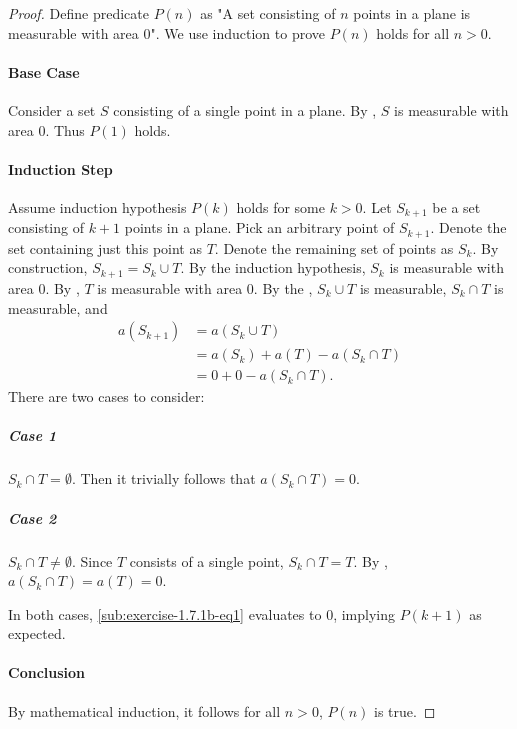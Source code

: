\documentclass{report}
\begin{document}
\begin{proof}

  Define predicate $P(n)$ as "A set consisting of $n$ points in a plane is
    measurable with area $0$".
  We use induction to prove $P(n)$ holds for all $n > 0$.

  \paragraph{Base Case}%

    Consider a set $S$ consisting of a single point in a plane.
    By , $S$ is measurable with area $0$.
    Thus $P(1)$ holds.

  \paragraph{Induction Step}%

    Assume induction hypothesis $P(k)$ holds for some $k > 0$.
    Let $S_{k+1}$ be a set consisting of $k + 1$ points in a plane.
    Pick an arbitrary point of $S_{k+1}$.
    Denote the set containing just this point as $T$.
    Denote the remaining set of points as $S_k$.
    By construction, $S_{k+1} = S_k \cup T$.
    By the induction hypothesis, $S_k$ is measurable with area $0$.
    By , $T$ is measurable with area $0$.
    By the , $S_k \cup T$ is
      measurable, $S_k \cap T$ is measurable, and
      \begin{align}
        a(S_{k+1})
          & = a(S_k \cup T) \nonumber \\
          & = a(S_k) + a(T) - a(S_k \cap T) \nonumber \\
          & = 0 + 0 - a(S_k \cap T). \label{sub:exercise-1.7.1b-eq1}
      \end{align}
    There are two cases to consider:

    \subparagraph{Case 1}%

      $S_k \cap T = \emptyset$.
      Then it trivially follows that $a(S_k \cap T) = 0$.

    \subparagraph{Case 2}%

      $S_k \cap T \neq \emptyset$.
      Since $T$ consists of a single point, $S_k \cap T = T$.
      By , $a(S_k \cap T) = a(T) = 0$.

    \vspace{8pt}
    \noindent
    In both cases, \eqref{sub:exercise-1.7.1b-eq1} evaluates to $0$, implying
      $P(k + 1)$ as expected.

  \paragraph{Conclusion}%

    By mathematical induction, it follows for all $n > 0$, $P(n)$ is true.

\end{proof}
\end{document}
